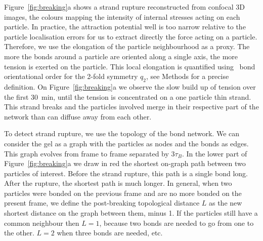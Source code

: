 Figure~\ref{fig:breaking}a shows a strand rupture reconstructed from confocal 3D images, the colours mapping the intensity of internal stresses acting on each particle. In practice, the attraction potential well is too narrow relative to the particle localisation errors for us to extract directly the force acting on a particle. Therefore, we use the elongation of the particle neighbourhood as a proxy. The more the bonds around a particle are oriented along a single axis, the more tension is exerted on the particle. This local elongation is quantified using~\cite{steinhardt1983boo} bond orientational order for the 2-fold symmetry $q_2$, see Methods for a precise definition. On Figure~\ref{fig:breaking}a we observe the slow build up of tension over the first \SI{30}{\minute}, until the tension is concentrated on a one particle thin strand. This strand breaks and the particles involved merge in their respective part of the network than can diffuse away from each other.

To detect strand rupture, we use the topology of the bond network. We can consider the gel as a graph with the particles as nodes and the bonds as edges. This graph evolves from frame to frame separated by $3\tau_B$. In the lower part of Figure~\ref{fig:breaking}a we draw in red the shortest on-graph path between two particles of interest. Before the strand rupture, this path is a single bond long. After the rupture, the shortest path is much longer. In general, when two particles were bonded on the previous frame and are no more bonded on the present frame, we define the post-breaking topological distance $L$ as the new shortest distance on the graph between them, minus 1. If the particles still have a common neighbour then $L=1$, because two bonds are needed to go from one to the other. $L=2$ when three bonds are needed, etc.


